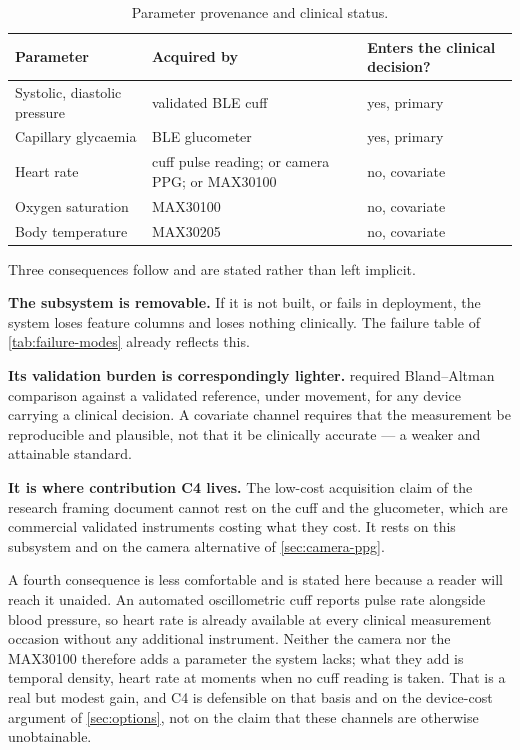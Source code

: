 \documentclass[12pt,a4paper,oneside]{report}
\begin{document}
\begin{table}[htbp]
\centering\small
\caption{Parameter provenance and clinical status.}\label{tab:parameter-provenance}
\begin{tabularx}{\textwidth}{@{}>{\raggedright\arraybackslash}p{4.0cm} X >{\raggedright\arraybackslash}p{3.4cm}@{}}
\toprule
\textbf{Parameter} & \textbf{Acquired by} & \textbf{Enters the clinical decision?} \\
\midrule
Systolic, diastolic pressure & validated BLE cuff & yes, primary \\
Capillary glycaemia & BLE glucometer & yes, primary \\
Heart rate & cuff pulse reading; or camera PPG; or MAX30100 & no, covariate \\
Oxygen saturation & MAX30100 & no, covariate \\
Body temperature & MAX30205 & no, covariate \\
\bottomrule
\end{tabularx}
\end{table}

Three consequences follow and are stated rather than left implicit.

\textbf{The subsystem is removable.} If it is not built, or fails in deployment, the system loses feature columns and loses nothing clinically. The failure table of \cref{tab:failure-modes} already reflects this.

\textbf{Its validation burden is correspondingly lighter.}  required Bland--Altman comparison against a validated reference, under movement, for any device carrying a clinical decision. A covariate channel requires that the measurement be reproducible and plausible, not that it be clinically accurate --- a weaker and attainable standard.

\textbf{It is where contribution C4 lives.} The low-cost acquisition claim of the research framing document cannot rest on the cuff and the glucometer, which are commercial validated instruments costing what they cost. It rests on this subsystem and on the camera alternative of \cref{sec:camera-ppg}.

A fourth consequence is less comfortable and is stated here because a reader will reach it unaided. An automated oscillometric cuff reports pulse rate alongside blood pressure, so heart rate is already available at every clinical measurement occasion without any additional instrument. Neither the camera nor the MAX30100 therefore adds a parameter the system lacks; what they add is temporal density, heart rate at moments when no cuff reading is taken. That is a real but modest gain, and C4 is defensible on that basis and on the device-cost argument of \cref{sec:options}, not on the claim that these channels are otherwise unobtainable.
\end{document}
